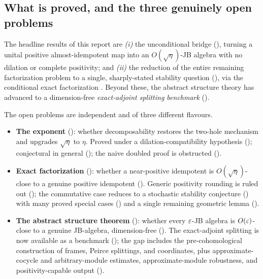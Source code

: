 \subsection{What is proved, and the three genuinely open problems}

The headline results of this report are \emph{(i)} the unconditional bridge
(), turning a unital positive almost-idempotent map into an
$O(\sqrt\eta)$-JB algebra with no dilation or complete positivity; and
\emph{(ii)} the reduction of the entire remaining factorization problem to a
single, sharply-stated stability question (), via the conditional
exact factorization . Beyond these, the abstract
structure theory has advanced to a dimension-free \emph{exact-adjoint splitting
benchmark} ().

The open problems are independent and of three different flavours.
\begin{itemize}[leftmargin=*]
  \item \textbf{The exponent} (): whether decomposability
    restores the two-hole mechanism and upgrades $\sqrt\eta$ to $\eta$. Proved
    under a dilation-compatibility hypothesis ();
    conjectural in general (); the naive doubled proof is
    obstructed ().
  \item \textbf{Exact factorization} ():
    whether a near-positive idempotent is $O(\sqrt\eta)$-close to a genuine
    positive idempotent (). Generic positivity rounding is ruled
    out (); the commutative case reduces to a stochastic
    stability conjecture () with many proved special cases
    () and a single remaining geometric lemma
    ().
  \item \textbf{The abstract structure theorem} (): whether
    every $\varepsilon$-JB algebra is $O(\varepsilon)$-close to a genuine JB-algebra,
    dimension-free (). The exact-adjoint splitting is
    now available as a benchmark (); the gap includes
    the pre-cohomological construction of frames, Peirce splittings, and
    coordinates, plus approximate-cocycle and arbitrary-module estimates,
    approximate-module robustness, and positivity-capable output
    ().
\end{itemize}

